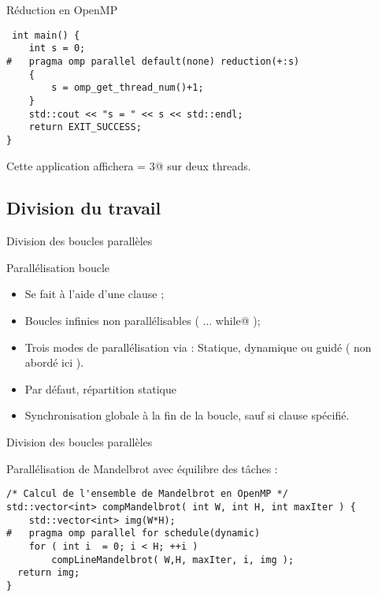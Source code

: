 \documentclass[handout,francais]{beamer}
\begin{document}
\begin{frame}[fragile]{Réduction en OpenMP}

\begin{lstlisting}
 int main() {
    int s = 0;
#   pragma omp parallel default(none) reduction(+:s)
    {
        s = omp_get_thread_num()+1;
    }
    std::cout << "s = " << s << std::endl;
    return EXIT_SUCCESS;
}
\end{lstlisting}

Cette application affichera \verb@s = 3@ sur deux threads.

\end{frame}

\subsection{Division du travail}

\begin{frame}[fragile]{Division des boucles parallèles}

\begin{block}{Parallélisation boucle}
 \begin{itemize}
  \item Se fait à l'aide d'une clause \verb@for@;
  \item Boucles infinies non parallélisables ( \lstinline@do ... while@ );
  \item Trois modes de parallélisation via \verb@schedule@ : Statique, dynamique
  ou guidé ( non abordé ici ).
  \item Par défaut, répartition statique
  \item Synchronisation globale à la fin de la boucle, sauf si clause \verb@nowait@ spécifié.
 \end{itemize}
\end{block}
\end{frame}
\begin{frame}[fragile]{Division des boucles parallèles}

Parallélisation de Mandelbrot avec équilibre des tâches :

\begin{lstlisting}
/* Calcul de l'ensemble de Mandelbrot en OpenMP */
std::vector<int> compMandelbrot( int W, int H, int maxIter ) {
    std::vector<int> img(W*H);
#   pragma omp parallel for schedule(dynamic)
    for ( int i  = 0; i < H; ++i )
        compLineMandelbrot( W,H, maxIter, i, img );
  return img;
}
\end{lstlisting}
\end{frame}
\end{document}
